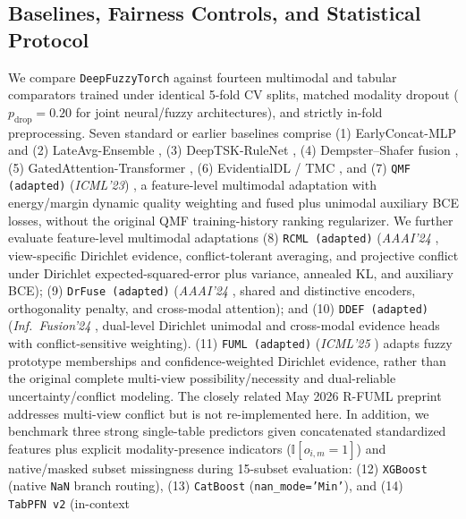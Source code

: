 \documentclass[10pt,twocolumn]{article}
\begin{document}
\subsection{Baselines, Fairness Controls, and Statistical Protocol}
We compare \texttt{DeepFuzzyTorch} against fourteen multimodal and tabular comparators trained
under identical 5-fold CV splits, matched modality dropout ($p_{\text{drop}}=0.20$ for joint
neural/fuzzy architectures), and strictly in-fold preprocessing. Seven standard or earlier
baselines comprise (1) EarlyConcat-MLP and (2) LateAvg-Ensemble
\cite{baltrusaitis2018multimodal},
(3) DeepTSK-RuleNet \cite{wu2020optimize}, (4) Dempster--Shafer fusion
\cite{shafer1976mathematical,denoeux2019decision}, (5) GatedAttention-Transformer
\cite{arevalo2017gated,vaswani2017attention}, (6) EvidentialDL / TMC
\cite{sensoy2018evidential,han2022trusted}, and (7) \texttt{QMF (adapted)}
(\textit{ICML'23}) \cite{zhang2023provable}, a feature-level multimodal adaptation with
energy/margin dynamic quality weighting and fused plus unimodal auxiliary BCE losses, without
the original QMF training-history ranking regularizer. We further evaluate feature-level
multimodal adaptations (8) \texttt{RCML (adapted)} (\textit{AAAI'24}
\cite{xu2024reliable}, view-specific Dirichlet evidence, conflict-tolerant averaging, and
projective conflict under Dirichlet expected-squared-error plus variance, annealed KL, and
auxiliary BCE); (9) \texttt{DrFuse (adapted)} (\textit{AAAI'24} \cite{yao2024drfuse},
shared and distinctive encoders, orthogonality penalty, and cross-modal attention); and
(10) \texttt{DDEF (adapted)} (\textit{Inf.\ Fusion'24} \cite{shao2024dual}, dual-level
Dirichlet unimodal and cross-modal evidence heads with conflict-sensitive weighting).
(11) \texttt{FUML (adapted)} (\textit{ICML'25} \cite{duan2025fuml}) adapts fuzzy prototype
memberships and confidence-weighted Dirichlet evidence, rather than the original complete
multi-view possibility/necessity and dual-reliable uncertainty/conflict modeling. The closely
related May 2026 R-FUML preprint
\cite{duan2026rfuml} addresses multi-view conflict but is not re-implemented here.
In
addition, we benchmark three strong
single-table predictors given concatenated standardized features plus explicit
modality-presence
indicators ($\mathbb{I}[o_{i,m}=1]$) and native/masked subset missingness during
15-subset evaluation: (12) \texttt{XGBoost} \cite{chen2016xgboost} (native \texttt{NaN}
branch routing), (13) \texttt{CatBoost} \cite{prokhorenkova2018catboost}
(\texttt{nan\_mode='Min'}), and (14) \texttt{TabPFN~v2} \cite{hollmann2025tabpfn} (in-context
\end{document}
